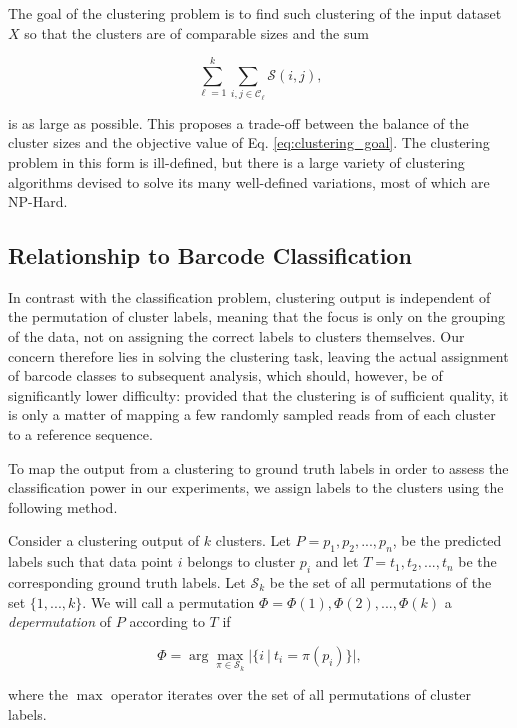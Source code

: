 The goal of the clustering problem is to find such clustering of the input dataset $X$ so that the clusters are of comparable sizes and the sum

\begin{equation}
\sum_{\ell=1}^k \sum_{i,j \in \mathcal{C}_{\ell}} \mathcal{S}(i, j),
\label{eq:clustering_goal}
\end{equation}

is as large as possible. This proposes a trade-off between the balance of the cluster sizes and the objective value of Eq. \ref{eq:clustering_goal}. The clustering problem in this form is ill-defined, but there is a large variety of clustering algorithms devised to solve its many well-defined variations, most of which are NP-Hard.

\subsection{Relationship to Barcode Classification} In contrast with the classification problem, clustering output is independent of the permutation of cluster labels, meaning that the focus is only on the grouping of the data, not on assigning the correct labels to clusters themselves. Our concern therefore lies in solving the clustering task, leaving the actual assignment of barcode classes to subsequent analysis, which should, however, be of significantly lower difficulty: provided that the clustering is of sufficient quality, it is only a matter of mapping a few randomly sampled reads from of each cluster to a reference sequence.

To map the output from a clustering to ground truth labels in order to assess the classification power in our experiments, we assign labels to the clusters using the following method. 

Consider a clustering output of $k$ clusters. Let $P = p_1, p_2, ..., p_n$, be the predicted labels such that data point $i$ belongs to cluster $p_i$ and let $T = t_1, t_2, ..., t_n$ be the corresponding ground truth labels. Let $\mathcal{S}_k$ be the set of all permutations of the set $\{1, ..., k\}$. We will call a permutation $\Phi = \Phi(1), \Phi(2), ..., \Phi(k)$ a \textit{depermutation} of $P$ according to $T$ if

\begin{equation}
\Phi = \arg \max_{\pi \in \mathcal{S}_k} |\{ i ~|~ t_i = \pi(p_i) \}|,
\end{equation}

where the $\max$ operator iterates over the set of all permutations of cluster labels.

